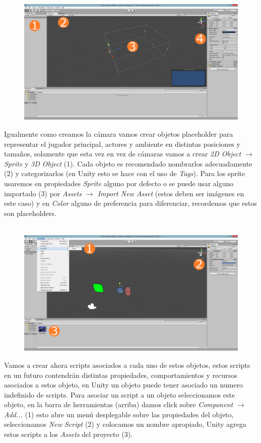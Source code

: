 \begin{figure}[H]
\centering
\includegraphics[width=0.80\linewidth]{media/1_ss5.jpg} 
\label{fig:unity_5}
\end{figure}

Igualmente como creamos la cámara vamos crear objetos placeholder para representar el jugador principal, actores y ambiente en distintas posiciones y tamaños, solamente que esta vez en vez de cámaras vamos a crear \emph{2D Object $\rightarrow$ Sprite} y \emph{3D Object} (1). Cada objeto es recomendado nombrarlos adecuadamente (2) y categorizarlos (en Unity esto se hace con el uso de \emph{Tags}). Para los sprite usaremos en propiedades \emph{Sprite} alguno por defecto o se puede usar alguno importado (3) por \emph{Assets $\rightarrow$ Import New Asset} (estos deben ser imágenes en este caso) y en \emph{Color} alguno de preferencia para diferenciar, recordemos que estos son placeholders.\\~

\begin{figure}[H]
\centering
\includegraphics[width=0.80\linewidth]{media/1_ss6.jpg} 
\label{fig:unity_6}
\end{figure}

Vamos a crear ahora scripts asociados a cada uno de estos objetos, estos scripts en un futuro contendrán distintas propiedades, comportamientos y recursos asociados a estos objeto, en Unity un objeto puede tener asociado un numero indefinido de scripts. Para asociar un script a un objeto seleccionamos este objeto, en la barra de herramientas (arriba) damos click sobre \emph{Component $\rightarrow$ Add...} (1) esto abre un menú desplegable sobre las propiedades del objeto, seleccionamos \emph{New Script} (2) y colocamos un nombre apropiado, Unity agrega estos scripts a los \emph{Assets} del proyecto (3).\\~

